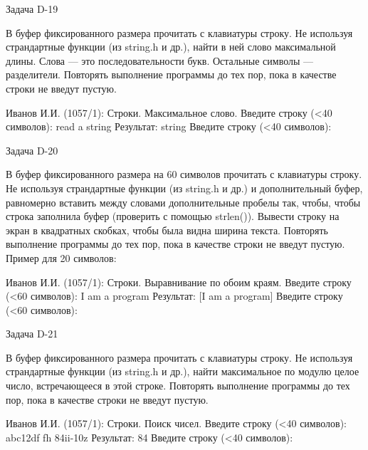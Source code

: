 Задача D-19

В буфер фиксированного размера прочитать с клавиатуры строку. Не используя
страндартные функции (из string.h и др.), найти в ней слово максимальной
длины. Слова — это последовательности букв. Остальные символы — разделители.
Повторять выполнение программы до тех пор, пока в качестве строки не введут
пустую.

Иванов И.И. (1057/1): Строки. Максимальное слово.
Введите строку (<40 символов): read a string
Результат: string
Введите строку (<40 символов):


Задача D-20

В буфер фиксированного размера на 60 символов прочитать с клавиатуры строку.
Не используя страндартные функции (из string.h и др.) и дополнительный буфер,
равномерно вставить между словами дополнительные пробелы так, чтобы, чтобы
строка заполнила буфер (проверить с помощью strlen()). Вывести строку на экран
в квадратных скобках, чтобы была видна ширина текста. Повторять выполнение
программы до тех пор, пока в качестве строки не введут пустую. Пример для 20
символов:

Иванов И.И. (1057/1): Строки. Выравнивание по обоим краям.
Введите строку (<60 символов): I am a program
Результат: [I   am   a   program]
Введите строку (<60 символов):


Задача D-21

В буфер фиксированного размера прочитать с клавиатуры строку. Не используя
страндартные функции (из string.h и др.), найти максимальное по модулю целое
число, встречающееся в этой строке. Повторять выполнение программы до тех пор,
пока в качестве строки не введут пустую.

Иванов И.И. (1057/1): Строки. Поиск чисел.
Введите строку (<40 символов): abc12df fh 84ii-10z
Результат: 84
Введите строку (<40 символов):

